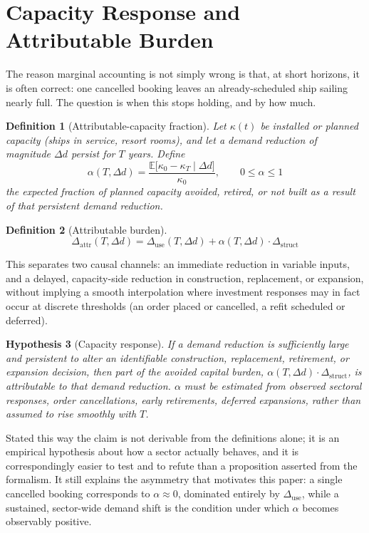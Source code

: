 \documentclass[11pt]{article}
\newtheorem{definition}{Definition}[section]
\newtheorem{hypothesis}[definition]{Hypothesis}
\begin{document}
\section{Capacity Response and Attributable Burden}

The reason marginal accounting is not simply wrong is that, at short horizons, it is often correct: one cancelled booking leaves an already-scheduled ship sailing nearly full. The question is when this stops holding, and by how much.

\begin{definition}[Attributable-capacity fraction]
Let $\kappa(t)$ be installed or planned capacity (ships in service, resort rooms), and let a demand reduction of magnitude $\Delta d$ persist for $T$ years. Define
\[
\alpha(T,\Delta d) = \frac{\mathbb{E}\big[\kappa_0 - \kappa_T \mid \Delta d\big]}{\kappa_0}, \qquad 0 \leq \alpha \leq 1
\]
the expected fraction of planned capacity avoided, retired, or not built as a result of that persistent demand reduction.
\end{definition}

\begin{definition}[Attributable burden]
\[
\Delta_{\text{attr}}(T,\Delta d) = \Delta_{\text{use}}(T,\Delta d) + \alpha(T,\Delta d)\cdot \Delta_{\text{struct}}
\]
\end{definition}

This separates two causal channels: an immediate reduction in variable inputs, and a delayed, capacity-side reduction in construction, replacement, or expansion, without implying a smooth interpolation where investment responses may in fact occur at discrete thresholds (an order placed or cancelled, a refit scheduled or deferred).

\begin{hypothesis}[Capacity response]
If a demand reduction is sufficiently large and persistent to alter an identifiable construction, replacement, retirement, or expansion decision, then part of the avoided capital burden, $\alpha(T,\Delta d)\cdot\Delta_{\text{struct}}$, is attributable to that demand reduction. $\alpha$ must be estimated from observed sectoral responses, order cancellations, early retirements, deferred expansions, rather than assumed to rise smoothly with $T$.
\end{hypothesis}

Stated this way the claim is not derivable from the definitions alone; it is an empirical hypothesis about how a sector actually behaves, and it is correspondingly easier to test and to refute than a proposition asserted from the formalism. It still explains the asymmetry that motivates this paper: a single cancelled booking corresponds to $\alpha \approx 0$, dominated entirely by $\Delta_{\text{use}}$, while a sustained, sector-wide demand shift is the condition under which $\alpha$ becomes observably positive.
\end{document}
